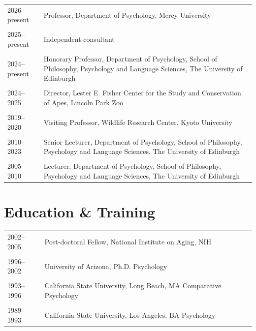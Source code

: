 \documentclass[11pt]{article}
\begin{document}
\begin{tabular}{p{3cm}p{12cm}}
  2026--present & Professor, Department of Psychology, Mercy University \\ \\
  
  2025--present & Independent consultant \\ \\ 
  
  2024--present & Honorary Professor, Department of Psychology, School
                  of Philosophy, Psychology and Language Sciences, The
                  University of Edinburgh \\ \\ 
  
  2024--2025 & Director, Lester E. Fisher Center for the Study and
               Conservation of Apes, Lincoln Park Zoo \\ \\

  2019--2020 & Visiting Professor, Wildlife Research Center, Kyoto
               University \\ \\ 

  2010--2023 & Senior Lecturer, Department of Psychology, School of
               Philosophy, Psychology and Language Sciences, The
               University of Edinburgh \\ \\

  2005--2010 & Lecturer, Department of Psychology, School of Philosophy,
               Psychology and Language Sciences, The University of
               Edinburgh 

\end{tabular}

\section*{Education \& Training}

\begin{tabular}{p{3cm}p{12cm}}
  2002--2005 & Post-doctoral Fellow, National Institute on Aging, NIH
\\ \\

  1996--2002 & University of Arizona, Ph.D. Psychology
\\ \\

  1993--1996 & California State University, Long Beach, MA Comparative
Psychology \\ \\

  1989--1993 & California State University, Los Angeles, BA Psychology
\end{tabular}
\end{document}

